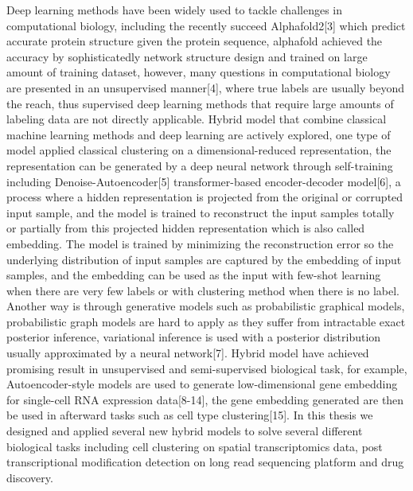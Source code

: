Deep learning methods have been widely used to tackle challenges in computational biology, including the recently succeed Alphafold2[3] which predict accurate protein structure given the protein sequence, alphafold achieved the accuracy by sophisticatedly network structure design and trained on large amount of training dataset, however, many questions in computational biology are presented in an unsupervised manner[4], where true labels are usually beyond the reach, thus supervised deep learning methods that require large amounts of labeling data are not directly applicable. Hybrid model that combine classical machine learning methods and deep learning are actively explored, one type of model applied classical clustering on a dimensional-reduced representation, the representation can be generated by a deep neural network through self-training including Denoise-Autoencoder[5] transformer-based encoder-decoder model[6], a process where a hidden representation is projected from the original or corrupted input sample, and the model is trained to reconstruct the input samples totally or partially from this projected hidden representation which is also called embedding. The model is trained by minimizing the reconstruction error so the underlying distribution of input samples are captured by the embedding of input samples, and the embedding can be used as the input with few-shot learning when there are very few labels or with clustering method when there is no label. Another way is through generative models such as probabilistic graphical models, probabilistic graph models are hard to apply as they suffer from intractable exact posterior inference, variational inference is used with a posterior distribution usually approximated by a neural network[7]. Hybrid model have achieved promising result in unsupervised and semi-supervised biological task, for example, Autoencoder-style models are used to generate low-dimensional gene embedding for single-cell RNA expression data[8-14], the gene embedding generated are then be used in afterward tasks such as cell type clustering[15]. In this thesis we designed and applied several new hybrid models to solve several different biological tasks including cell clustering on spatial transcriptomics data, post transcriptional modification detection on long read sequencing platform and drug discovery. 
